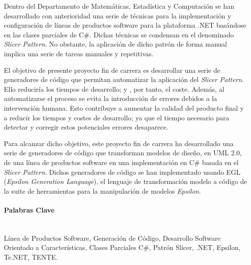 
Dentro del Departamento de Matemáticas, Estadística y Computación se han desarrollado con anterioridad una serie de técnicas para la implementación y configuración de líneas de productos software para la plataforma .NET basándose en las clases parciales de C\#. Dichas técnicas se condensan en el denominado \emph{Slicer Pattern}. No obstante, la aplicación de dicho patrón de forma manual implica una serie de tareas manuales y repetitivas.

El objetivo de presente proyecto fin de carrera es desarrollar una serie de generadores de código que permitan automatizar la aplicación del \emph{Slicer Pattern}. Ello reduciría los tiempos de desarrollo; y , por tanto, el coste. Además, al automatizarse el proceso se evita la introducción de errores debidos a la intervención humana. Esto contribuye a aumentar la calidad del producto final y a reducir los tiempos y costes de desarrollo; ya que el tiempo necesario para detectar y corregir estos potenciales errores desaparece.

Para alcanzar dicho objetivo, este proyecto fin de carrera ha desarrollado una serie de generadores de código que transforman modelos de diseño, en UML 2.0, de una línea de productos software en una implementación en C\# basada en el \emph{Slicer Pattern}. Dichos generadores de código se han implementado usando EGL (\emph{Epsilon Generation Language}), el lenguaje de transformación modelo a código de la suite de herramientas para la manipulación de modelos \emph{Epsilon}.

\paragraph{Palabras Clave} \ \\

Línea de Productos Software, Generación de Código, Desarrollo Software Orientado a Características, Clases Parciales C\#, Patrón Slicer, .NET, Epsilon, Te.NET, TENTE.



